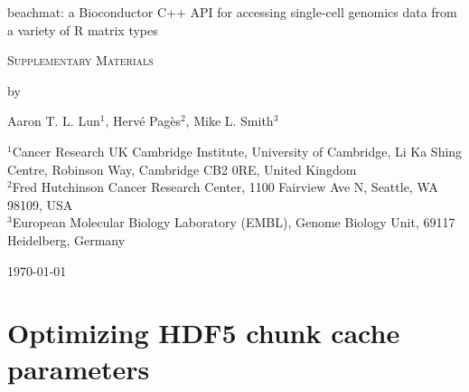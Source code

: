 \documentclass{article}
\begin{document}
\begin{titlepage}
\vspace*{3cm}
\begin{center}


{\LARGE
beachmat: a Bioconductor C++ API for accessing single-cell genomics data from a variety of R matrix types
\par}

\vspace{0.75cm}

{\Large
    \textsc{Supplementary Materials}
\par
}
\vspace{0.75cm}

\large
by


\vspace{0.75cm}
Aaron T. L. Lun$^1$,
Herv\'e Pag\`es$^2$,
Mike L. Smith$^3$

\vspace{1cm}
\begin{minipage}{0.9\textwidth}
\begin{flushleft}
$^1$Cancer Research UK Cambridge Institute, University of Cambridge, Li Ka Shing Centre, Robinson Way, Cambridge CB2 0RE, United Kingdom \\[6pt]
$^2$Fred Hutchinson Cancer Research Center, 1100 Fairview Ave N, Seattle, WA 98109, USA \\[6pt]
$^3$European Molecular Biology Laboratory (EMBL), Genome Biology Unit, 69117 Heidelberg, Germany \\[6pt]
\end{flushleft}
\end{minipage}

\vspace{1.5cm}
{\large \today{}}

\vspace*{\fill}
\end{center}
\end{titlepage}

\providecommand{\myceil}[1]{\left \lceil #1 \right \rceil }

\section{Optimizing HDF5 chunk cache parameters}
\end{document}
